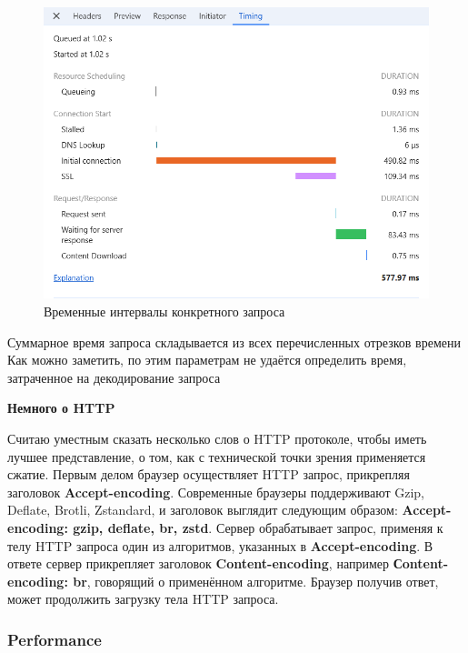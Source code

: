 \documentclass[12pt]{article}
\begin{document}
\begin{figure}[H]
    \centering
    \includegraphics[width=1\textwidth]{../images/network__timing.png}
    \caption{Временные интервалы конкретного запроса}
\end{figure}

Суммарное время запроса складывается из всех перечисленных отрезков времени
Как можно заметить, по этим параметрам не удаётся определить время,
затраченное на декодирование запроса

\textbf{Немного о HTTP}

Считаю уместным сказать несколько слов о HTTP протоколе, чтобы иметь лучшее представление,
о том, как с технической точки зрения применяется сжатие.
Первым делом браузер осуществляет HTTP запрос, прикрепляя заголовок \textbf{Accept-encoding}.
Современные браузеры поддерживают Gzip, Deflate, Brotli, Zstandard,
и заголовок выглядит следующим
образом: \textbf{Accept-encoding: gzip, deflate, br, zstd}.
Сервер обрабатывает запрос, применяя к телу HTTP запроса один из алгоритмов,
указанных в \textbf{Accept-encoding}. В ответе сервер прикрепляет заголовок \textbf{Content-encoding},
например \textbf{Сontent-encoding: br}, говорящий о применённом алгоритме. Браузер получив ответ,
может продолжить загрузку тела HTTP запроса.

\subsubsection{Performance}
\end{document}
